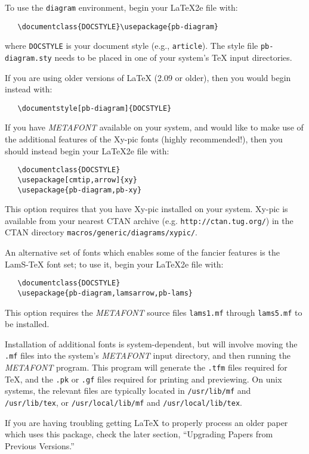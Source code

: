 \documentclass[12pt]{article}\usepackage{pb-diagram}
\begin{document}
To use the \verb"diagram" environment, begin your
\ifx\fmtname\tooee\LaTeXe\else\LaTeX2e\fi{} file with:
\begin{verbatim}
   \documentclass{DOCSTYLE}\usepackage{pb-diagram}
\end{verbatim}
where \verb"DOCSTYLE" is your document style (e.g.,
\verb"article").  The style file \verb"pb-diagram.sty" needs to
be placed in one of your system's \TeX{} input directories.

If you are using older versions of \LaTeX{} (2.09 or older), then
you would begin instead with:
\begin{verbatim}
   \documentstyle[pb-diagram]{DOCSTYLE}
\end{verbatim}

If you have {\em METAFONT\/} available on your system,
and would like to make use of the additional features
of the Xy-pic fonts (highly recommended!), then you should
instead begin your
\ifx\fmtname\tooee\LaTeXe\else\LaTeX2e\fi{} file with:
\begin{verbatim}
   \documentclass{DOCSTYLE}
   \usepackage[cmtip,arrow]{xy}
   \usepackage{pb-diagram,pb-xy}
\end{verbatim}
This option requires that you have Xy-pic installed on your
system.  Xy-pic is available from your nearest CTAN archive
(e.g. {\tt http://ctan.tug.org/}) in the CTAN directory
{\tt macros/generic/diagrams/xypic/}.

An alternative set of fonts which enables some of the
fancier features is the {\sc LamS}-\TeX{} font set; to
use it, begin your
\ifx\fmtname\tooee\LaTeXe\else\LaTeX2e\fi{} file with:
\begin{verbatim}
   \documentclass{DOCSTYLE}
   \usepackage{pb-diagram,lamsarrow,pb-lams}
\end{verbatim}
This option requires the {\em METAFONT\/} source files
\verb"lams1.mf" through \verb"lams5.mf" to be installed.

Installation of additional fonts is system-dependent,
but will involve moving the \verb".mf" files into the system's
{\em METAFONT\/} input directory, and then running the
{\em METAFONT\/} program.  This program will generate the
\verb".tfm" files required for \TeX, and the \verb".pk" or
\verb".gf" files required for printing and previewing.
On {\sc unix} systems, the relevant files are typically
located in \verb"/usr/lib/mf" and \verb"/usr/lib/tex", or 
\verb"/usr/local/lib/mf" and \verb"/usr/local/lib/tex".

If you are having troubling getting \LaTeX{} to properly
process an older paper which uses this package, check the
later section, ``Upgrading Papers from Previous Versions.''
\end{document}
